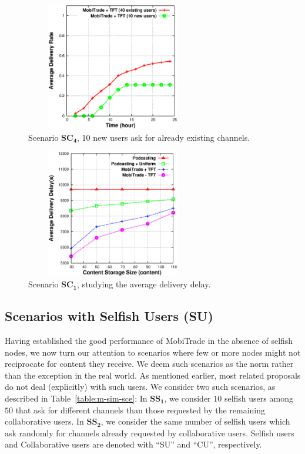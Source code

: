 \begin{figure}[!h]
  \begin{center}
    \includegraphics[width=3in,height=2.2in]{Chapitre5/fig8.eps}
  \end{center}
  \caption{Scenario $\mathbf{SC_4}$, 10 new users ask for already existing channels.}
  \label{10-new-users}
\end{figure}

\begin{figure}[!h]
  \begin{center}
    \includegraphics[width=3in,height=2.2in]{Chapitre5/fig12.eps}
  \end{center}
  \caption{Scenario $\mathbf{SC_1}$, studying the average delivery delay.}
  \label{avg-delay}
\end{figure}

\subsection{Scenarios with Selfish Users (SU)}
\label{selfish-scenario}

Having established the good performance of MobiTrade in the absence of selfish nodes, we now turn our attention to scenarios where few or more nodes might not reciprocate for content they receive. We deem such scenarios as the norm rather than the exception in the real world. As mentioned earlier, most related proposals do not deal (explicitly) with such users. We consider two such scenarios, as described in Table~\ref{table:m-sim-sce}: In $\mathbf{SS_{1}}$, we consider $10$ selfish users among $50$ that ask for different channels than those requested by the remaining collaborative users. In $\mathbf{SS_{2}}$, we consider the same number of selfish users which ask randomly for channels already requested by collaborative users. Selfish users and Collaborative users are denoted with ``SU'' and ``CU'', respectively.

